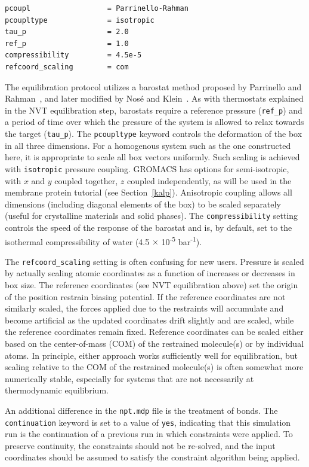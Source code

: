 \documentclass[9pt,tutorial]{livecoms}
\begin{document}
\begin{verbatim}
pcoupl                  = Parrinello-Rahman
pcoupltype              = isotropic
tau_p                   = 2.0
ref_p                   = 1.0
compressibility         = 4.5e-5
refcoord_scaling        = com
\end{verbatim}

The equilibration protocol utilizes a barostat method proposed by Parrinello and Rahman~\cite{Parrinello1981}, and later modified by Nos\'e and Klein~\cite{Nose1983}. As with thermostats explained in the NVT equilibration step, barostats require a reference pressure (\texttt{ref\_p}) and a period of time over which the pressure of the system is allowed to relax towards the target (\texttt{tau\_p}). The \texttt{pcoupltype} keyword controls the deformation of the box in all three dimensions. For a homogenous system such as the one constructed here, it is appropriate to scale all box vectors uniformly. Such scaling is achieved with \texttt{isotropic} pressure coupling. GROMACS has options for semi-isotropic, with $x$ and $y$ coupled together, $z$ coupled independently, as will be used in the membrane protein tutorial (see Section~\ref{kalp}). Anisotropic coupling allows all dimensions (including diagonal elements of the box) to be scaled separately (useful for crystalline materials and solid phases). The \texttt{compressibility} setting controls the speed of the response of the barostat and is, by default, set to the isothermal compressibility of water (4.5 $\times$ 10\textsuperscript{-5} bar\textsuperscript{-1}). 

The \texttt{refcoord\_scaling} setting is often confusing for new users. Pressure is scaled by actually scaling atomic coordinates as a function of increases or decreases in box size. The reference coordinates (see NVT equilibration above) set the origin of the position restrain biasing potential. If the reference coordinates are not similarly scaled, the forces applied due to the restraints will accumulate and become artificial as the updated coordinates drift slightly and are scaled, while the reference coordinates remain fixed. Reference coordinates can be scaled either based on the center-of-mass (COM) of the restrained molecule(s) or by individual atoms. In principle, either approach works sufficiently well for equilibration, but scaling relative to the COM of the restrained molecule(s) is often somewhat more numerically stable, especially for systems that are not necessarily at thermodynamic equilibrium.

An additional difference in the \texttt{npt.mdp} file is the treatment of bonds. The \texttt{continuation} keyword is set to a value of \texttt{yes}, indicating that this simulation run is the continuation of a previous run in which constraints were applied. To preserve continuity, the constraints should not be re-solved, and the input coordinates should be assumed to satisfy the constraint algorithm being applied.
\end{document}
